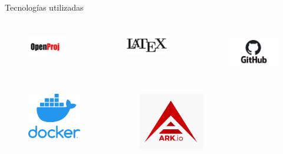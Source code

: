 \documentclass[10pt,aspectratio=169,]{beamer}
\begin{document}
\begin{frame}{Tecnologías utilizadas}
	\vspace*{-0.6cm}
	\begin{columns}[onlytextwidth]
		\begin{figure}
			\centering
			\includegraphics[height=1.5cm]{openproj.png}
		\end{figure}
		\begin{figure}
			\centering
			\includegraphics[height=1.3cm]{latex.png}
		\end{figure}
		\begin{figure}
			\centering
			\includegraphics[height=2cm]{GitHub.png}
		\end{figure}
	\end{columns}
	\vspace*{1cm}
	\begin{columns}[onlytextwidth]
		\begin{figure}
			\raggedleft
			\includegraphics[height=2cm]{docker.png}
		\end{figure}
		\begin{figure}
			\centering
			\includegraphics[height=2.5cm]{ark.jpg}
		\end{figure}
	\end{columns}
	
\end{frame}
\end{document}
